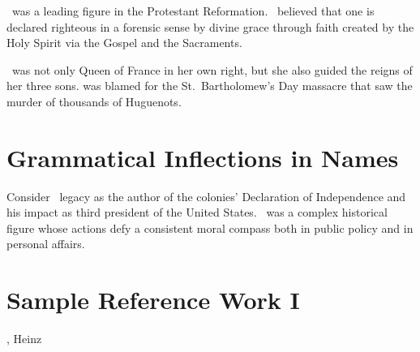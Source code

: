\documentclass[oneside]{article}
\begin{document}
\renewcommand*\MainNameHook{\sffamily\AltOff}

\ForgetThis\Luth\ was a leading figure in the Protestant
Reformation. \Luth\ believed that one is declared
righteous in a forensic sense by divine grace through faith
created by the Holy Spirit via the Gospel and the Sacraments.

\ForgetThis\Cath\ was not only Queen of France in her own right,
but she also guided the reigns of her three sons.
\CapThis{}
was blamed for the St.\ Bartholomew's Day massacre that saw the
murder of thousands of Huguenots.

%
%

\section{Grammatical Inflections in Names}

\newif\ifGenitive
\newif\ifDoGenitive

\newcommand*\GEN{\ifDoGenitive\textSC{'s}\fi}

\renewcommand*\NamesFormat[1]
  {\ifGenitive\DoGenitivetrue\fi#1\global\Genitivefalse}
\renewcommand*\MainNameHook[1]
  {\ifGenitive\DoGenitivetrue\fi\AltOff#1\global\Genitivefalse}

Consider \Genitivetrue\Jeff\ legacy as the author of the
colonies' Declaration of Independence and his impact as third
president of the United States. \Jeff\ was a complex historical
figure whose actions defy a consistent moral compass both in
public policy and in personal affairs.

%
%

\section{Sample Reference Work I}


  {\noexpand{}, Heinz}


\renewcommand*\NamesFormat{}
\renewcommand*\MainNameHook{\AltOff}
\end{document}
